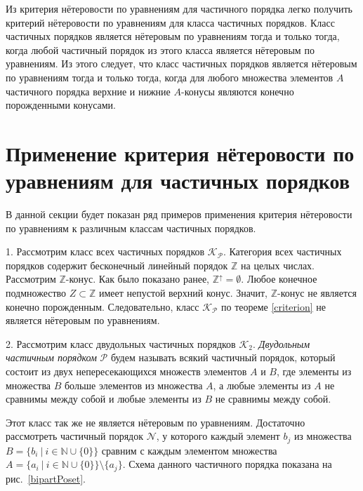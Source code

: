 \documentclass[12pt]{article}
\theoremstyle{break}
\def\P{\mathcal{P}}
\begin{document}
		Из критерия нётеровости по уравнениям для частичного порядка легко получить критерий нётеровости по уравнениям для класса частичных порядков. Класс частичных порядков является нётеровым по уравнениям тогда и только тогда, когда любой частичный порядок из этого класса является нётеровым по уравнениям. Из этого следует, что класс частичных порядков является нётеровым по уравнениям тогда и только тогда, когда для любого множества элементов $A$ частичного порядка верхние и нижние $A$-конусы являются конечно порожденными конусами.


	\section{Применение критерия нётеровости по уравнениям для частичных порядков}
		В данной секции будет показан ряд примеров применения критерия нётеровости по уравнениям к различным классам частичных порядков.

		1. Рассмотрим класс всех частичных порядков $\mathcal{K}_{\P}.$ Категория всех частичных порядков содержит бесконечный линейный порядок $\mathbb{Z}$ на целых числах. Рассмотрим $\mathbb{Z}$-конус. Как было показано ранее, $\mathbb{Z}^{\uparrow} = \emptyset$. Любое конечное подмножество $Z\subset\mathbb{Z}$ имеет непустой верхний конус. Значит, $\mathbb{Z}$-конус не является конечно порожденным. Следовательно, класс $\mathcal{K}_{\P}$ по теореме \ref{criterion} не является нётеровым по уравнениям.

		2. Рассмотрим класс двудольных частичных порядков $\mathcal{K}_2$. \textit{Двудольным частичным порядком} $\P$ будем называть всякий частичный порядок, который состоит из двух непересекающихся множеств элементов $A$ и $B$, где элементы из множества $B$ больше элементов из множества $A$, а любые элементы из $A$ не сравнимы между собой и любые элементы из $B$ не сравнимы между собой.

		Этот класс так же не является нётеровым по уравнениям. Достаточно рассмотреть частичный порядок $\mathcal{N}$, у которого каждый элемент $b_j$ из множества $B = \{b_i\ |\ i\in \mathbb{N}\cup\{0\}\}$ сравним с каждым элементом множества $A = \{a_i\ |\ i\in \mathbb{N}\cup\{0\}\} \setminus \{a_j\}$. Схема данного частичного порядка показана на рис.~\ref{bipartPoset}.
\end{document}
